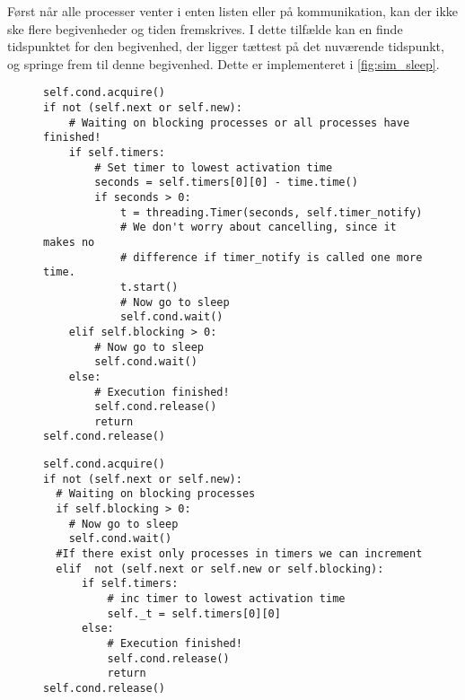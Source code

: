 Først når alle processer venter i enten  listen eller på kommunikation, kan der ikke ske flere begivenheder og tiden fremskrives. 
I dette tilfælde  kan \sched en finde tidspunktet for den begivenhed, der ligger tættest på det nuværende tidspunkt,  og springe frem til denne begivenhed. Dette er implementeret i \cref{fig:sim_sleep}.
\begin{figure}[hbtp]
\begin{minipage}[c]{\linewidth}
\begin{lstlisting}[firstnumber=239, label=fig:blocking_sleep, caption=Uddrag af \sched en i \code{Scheduler}]
self.cond.acquire()
if not (self.next or self.new):
    # Waiting on blocking processes or all processes have finished!
    if self.timers:
        # Set timer to lowest activation time
        seconds = self.timers[0][0] - time.time()
        if seconds > 0:
            t = threading.Timer(seconds, self.timer_notify)
            # We don't worry about cancelling, since it makes no 
            # difference if timer_notify is called one more time.
            t.start()
            # Now go to sleep
            self.cond.wait()
    elif self.blocking > 0:
        # Now go to sleep
        self.cond.wait()
    else:
        # Execution finished!
        self.cond.release()
        return
self.cond.release()
\end{lstlisting}
\end{minipage}
\begin{minipage}[c]{\linewidth}
\begin{lstlisting}[firstnumber=158, label=fig:sim_sleep, caption= Uddrag af \sched en i \code{Simulation}]
self.cond.acquire()
if not (self.next or self.new):
  # Waiting on blocking processes
  if self.blocking > 0:
    # Now go to sleep
    self.cond.wait()
  #If there exist only processes in timers we can increment
  elif  not (self.next or self.new or self.blocking): 
      if self.timers:
          # inc timer to lowest activation time
          self._t = self.timers[0][0]
      else:
          # Execution finished!
          self.cond.release()
          return
self.cond.release()  
\end{lstlisting}
\end{minipage}
\end{figure}



